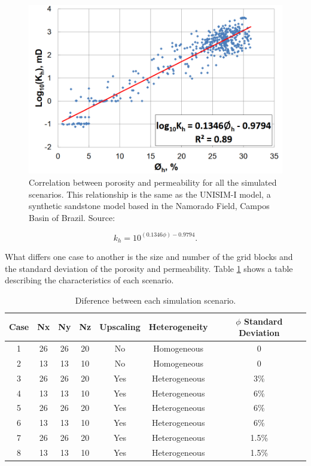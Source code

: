 \begin{figure}[H]
	\centering
	\includegraphics[width=0.8\linewidth]{Images/35}
	\caption{Correlation between porosity and permeability for all the simulated scenarios. This relationship is the same as the UNISIM-I model, a synthetic sandstone model based in the Namorado Field, Campos Basin of Brazil. Source: \cite{Avansi2015}}
	\label{fig:35}
\end{figure}

\begin{equation}\label{results1}
k_h = 10^{(0.1346\phi)-0.9794}.
\end{equation}

What differs one case to another is the size and number of the grid blocks and the standard deviation of the porosity and permeability. Table \ref{fig:36} shows a table describing the characteristics of each scenario.

\begin{table}[htbp]
	\centering
	\caption{Diference between each simulation scenario.}
	\label{fig:36}
	\begin{tabular}{c c c c c c c}
		\toprule
		Case & Nx & Ny & Nz & Upscaling & Heterogeneity & $\phi$ Standard Deviation\\
		\midrule
		1 & 26 & 26 & 20 & No & Homogeneous & 0\\
		2 & 13 & 13 & 10 & No & Homogeneous & 0\\
		3 & 26 & 26 & 20 & Yes & Heterogeneous & 3\%\\
		4 & 13 & 13 & 10 & Yes & Heterogeneous & 6\%\\
		5 & 26 & 26 & 20 & Yes & Heterogeneous & 6\%\\
		6 & 13 & 13 & 10 & Yes & Heterogeneous & 6\%\\
		7 & 26 & 26 & 20 & Yes & Heterogeneous & 1.5\%\\
		8 & 13 & 13 & 10 & Yes & Heterogeneous & 1.5\%\\
		\bottomrule
	\end{tabular}
\end{table}

